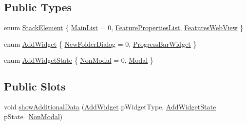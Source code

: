 \subsection*{Public Types}
\begin{DoxyCompactItemize}
\item 
enum \hyperlink{class_u_b_features_central_widget_a1657c232f5793258dcab8a3fd4bc9437}{Stack\-Element} \{ \hyperlink{class_u_b_features_central_widget_a1657c232f5793258dcab8a3fd4bc9437a7f0761779415ca79f7cf963c1e67dbbf}{Main\-List} =  0, 
\hyperlink{class_u_b_features_central_widget_a1657c232f5793258dcab8a3fd4bc9437aa245babedd2f5cbda9c10da8e25bb087}{Feature\-Properties\-List}, 
\hyperlink{class_u_b_features_central_widget_a1657c232f5793258dcab8a3fd4bc9437a3f6ab563704242bffdcb60bf001e6fa9}{Features\-Web\-View}
 \}
\item 
enum \hyperlink{class_u_b_features_central_widget_af62bd6ce4889a318b274d11860faa5eb}{Add\-Widget} \{ \hyperlink{class_u_b_features_central_widget_af62bd6ce4889a318b274d11860faa5eba8e24ccf7c240770cd63d571d9d29c9c3}{New\-Folder\-Dialog} =  0, 
\hyperlink{class_u_b_features_central_widget_af62bd6ce4889a318b274d11860faa5eba5c157ba7aa8fc67491a6626272042ba8}{Progress\-Bar\-Widget}
 \}
\item 
enum \hyperlink{class_u_b_features_central_widget_a2e55790bc26451af3e564d268f320561}{Add\-Widget\-State} \{ \hyperlink{class_u_b_features_central_widget_a2e55790bc26451af3e564d268f320561a03c69e49665723b4e3eaf9a8f3dcd48d}{Non\-Modal} =  0, 
\hyperlink{class_u_b_features_central_widget_a2e55790bc26451af3e564d268f320561a8eb4cdb4b017e0003e494f2512452148}{Modal}
 \}
\end{DoxyCompactItemize}
\subsection*{Public Slots}
\begin{DoxyCompactItemize}
\item 
void \hyperlink{class_u_b_features_central_widget_ab0e4b0dd2473676a380989113adac7c6}{show\-Additional\-Data} (\hyperlink{class_u_b_features_central_widget_af62bd6ce4889a318b274d11860faa5eb}{Add\-Widget} p\-Widget\-Type, \hyperlink{class_u_b_features_central_widget_a2e55790bc26451af3e564d268f320561}{Add\-Widget\-State} p\-State=\hyperlink{class_u_b_features_central_widget_a2e55790bc26451af3e564d268f320561a03c69e49665723b4e3eaf9a8f3dcd48d}{Non\-Modal})
\end{DoxyCompactItemize}
